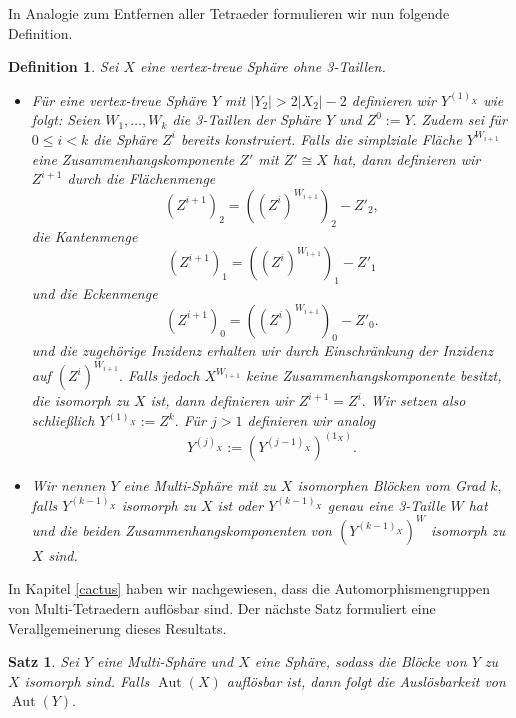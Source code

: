 \documentclass[12pt,titlepage,twoside,cleardoublepage]{article}
\theoremstyle{nummermitklammern}
\newtheorem{definition}[temp]{Definition}
\newtheorem{satz}[temp]{Satz}
\newtheorem{definition}[zahl]{Definition}
\newtheorem{satz}[zahl]{Satz}
\numberwithin{equation}{section}
\DeclareMathOperator{\Aut}{Aut}
\begin{document}
In Analogie zum Entfernen aller Tetraeder formulieren wir nun folgende Definition.
\begin{definition}
Sei $X$ eine vertex-treue Sphäre ohne 3-Taillen.
\begin{itemize}
\item Für eine vertex-treue Sphäre $Y$ mit $\vert Y_2 \vert > 2\vert X_2 \vert-2$ definieren wir $Y^{(1)_X}$ wie folgt:
Seien $W_1,\ldots,W_k$ die 3-Taillen der Sphäre $Y$ und $Z^0:=Y.$ 
Zudem sei für $0\leq i < k$ die Sphäre $Z^i$ bereits konstruiert.
Falls die simplziale Fläche $Y^{W_{i+1}}$ eine Zusammenhangskomponente $Z'$ mit $Z'\cong X$ hat, dann definieren wir $Z^{i+1}$ durch die Flächenmenge 
\[
(Z^{i+1})_2=((Z^{i})^{W_{i+1}})_2-Z'_2,
\]
die Kantenmenge
\[
(Z^{i+1})_1=((Z^{i})^{W_{i+1}})_1-Z'_1
\]
und die Eckenmenge 
\[
(Z^{i+1})_0=((Z^{i})^{W_{i+1}})_0-Z'_0.
\]
und die zugehörige Inzidenz erhalten wir durch Einschränkung der Inzidenz auf $(Z^{i})^{W_{i+1}}.$
Falls jedoch $X^{W_{i+1}}$ keine Zusammenhangskomponente besitzt, die isomorph zu $X$ ist, dann definieren wir $Z^{i+1}=Z^i.$ Wir setzen also schließlich $Y^{(1)_X}:=Z^{k}.$ 
Für $j>1$ definieren wir analog 
\[
Y^{(j)_X}:={(Y^{(j-1)_X})}^{(1_X)}.
\]
\item Wir nennen $Y$ eine Multi-Sphäre mit zu $X$ isomorphen Blöcken vom Grad $k,$ falls $Y^{(k-1)_X}$ isomorph zu $X$ ist oder $Y^{(k-1)_X}$ genau eine 3-Taille $W$ hat und die beiden Zusammenhangskomponenten von $(Y^{(k-1)_X})^W$ isomorph zu $X$ sind.
\end{itemize}
\end{definition}
In Kapitel \ref{cactus} haben wir nachgewiesen, dass die Automorphismengruppen von Multi-Tetraedern auflösbar sind. Der nächste Satz formuliert eine Verallgemeinerung dieses Resultats. 
\begin{satz}\label{aufl}
Sei $Y$ eine Multi-Sphäre und $X$ eine Sphäre, sodass die Blöcke von $Y$ zu $X$ isomorph sind. Falls $\Aut(X)$ auflösbar ist, dann folgt die Auslösbarkeit von $\Aut(Y).$ 
\end{satz}
\end{document}
